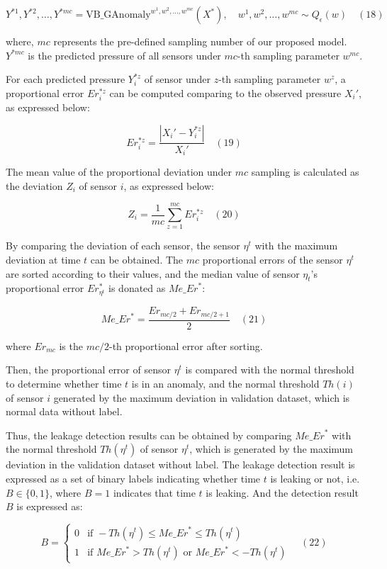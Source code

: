 $$
Y^{*1},Y^{*2},\dots,Y^{*mc} = \mathrm{VB\_GAnomaly}^{w^1,w^2,\dots,w^{mc}}(X^*), \quad w^1,w^2,\dots,w^{mc} \sim Q_\epsilon(w) \quad (18)
$$

where, $mc$ represents the pre-defined sampling number of our proposed model. $Y^{*mc}$ is the predicted pressure of all sensors under $mc$-th sampling parameter $w^{mc}$.

For each predicted pressure $Y_i^{*z}$ of sensor under $z$-th sampling parameter $w^z$, a proportional error $Er_{i}^{*z}$ can be computed comparing to the observed pressure $X_i'$, as expressed below:

$$
Er_{i}^{*z} = \frac{|X_i' - Y_{i}^{*z}|}{X_i'}  \quad (19)
$$

The mean value of the proportional deviation under $mc$ sampling is calculated as the deviation $Z_i$ of sensor $i$, as expressed below:

$$
Z_i = \frac{1}{mc} \sum_{z=1}^{mc} Er_{i}^{*z} \quad (20)
$$

By comparing the deviation of each sensor, the sensor $\eta^t$ with the maximum deviation at time $t$ can be obtained. The $mc$ proportional errors of the sensor $\eta^t$ are sorted according to their values, and the median value of sensor $\eta_t$’s proportional error $Er_{\eta^t}^*$ is donated as ${Me\_Er}^*$:

$$
{Me\_Er}^* = \frac{Er_{mc/2} + Er_{mc/2 + 1}}{2} \quad (21)
$$

where $Er_{mc}$ is the ${mc/2}$-th proportional error after sorting.

Then, the proportional error of sensor $\eta^t$ is compared with the normal threshold to determine whether time $t$ is in an anomaly, and the normal threshold $Th(i)$ of sensor $i$ generated by the maximum deviation in validation dataset, which is normal data without label.

Thus, the leakage detection results can be obtained by comparing ${Me\_Er}^*$ with the normal threshold $Th(\eta^t)$ of sensor $\eta^t$, which is generated by the maximum deviation in the validation dataset without label. The leakage detection result is expressed as a set of binary labels indicating whether time $t$ is leaking or not, i.e. $B \in \{0,1\}$, where $B = 1$ indicates that time $t$ is leaking. And the detection result $B$ is expressed as:

$$
B = \begin{cases}
0 & \text{if } -Th(\eta^t) \leq {Me\_Er}^* \leq Th(\eta^t) \\
1 & \text{if } {Me\_Er}^* > Th(\eta^t) \text{ or } {Me\_Er}^* < -Th(\eta^t)
\end{cases} \quad (22)
$$

